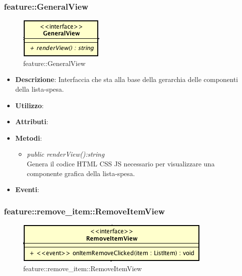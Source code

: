 \subsubsection{feature::GeneralView}

\label{feature::GeneralView}
\begin{figure}[ht]
	\centering
	\includegraphics[scale=0.5]{Sezioni/SottosezioniST/img/app/GeneralView.png}
	\caption{feature::GeneralView}
\end{figure}

\begin{itemize}
\item \textbf{Descrizione}: Interfaccia che sta alla base della gerarchia delle componenti della lista-spesa.
\item \textbf{Utilizzo}:
\item \textbf{Attributi}: 
\item \textbf{Metodi}:
	\begin{itemize}
	\item \textit{public renderView():string}\\
	Genera il codice HTML CSS JS necessario per visualizzare una componente grafica della lista-spesa.
	\end{itemize}
\item \textbf{Eventi}:
\end{itemize}

\subsubsection{feature::remove\_item::RemoveItemView}

\label{feature::remove_item::RemoveItemView}
\begin{figure}[ht]
	\centering
	\includegraphics[scale=0.5]{Sezioni/SottosezioniST/img/app/RemoveItemView.png}
	\caption{feature::remove\_item::RemoveItemView}
\end{figure}

